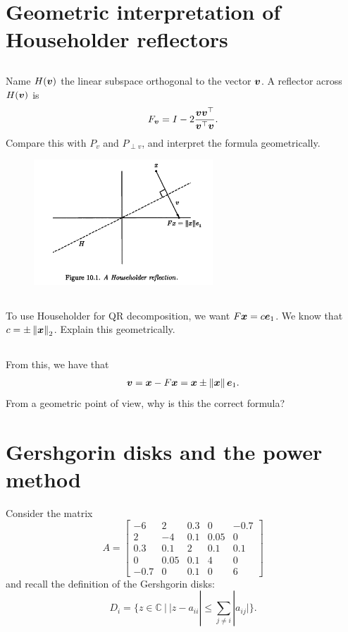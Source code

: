 \documentclass[11pt,letterpaper]{article}
\begin{document}
 

\section{Geometric interpretation of Householder reflectors}
\subsection{}
Name $H(\boldsymbol{v})$ the linear subspace orthogonal to the vector $\boldsymbol{v}$. A reflector across $H(\boldsymbol{v})$ is 
\begin{align*}
    F_{\boldsymbol{v}} = I - 2 \frac{\boldsymbol{v} \boldsymbol{v}^\top}{\boldsymbol{v}^\top \boldsymbol{v}}.
\end{align*}
Compare this with $P_v$ and $P_{\perp v}$, and interpret the formula geometrically.

\begin{figure}[H]
    \centering
    \includegraphics[width = 0.6\textwidth]{Session_7/latex/figs/TB_HouseholderRef}
\end{figure}

\subsection{}
To use Householder for QR decomposition, we want $F\boldsymbol{x} = c\boldsymbol{e}_1$. We know that $c = \pm\left\Vert \boldsymbol{x} \right\Vert_2$. Explain this geometrically.

\subsection{}
From this, we have that
\begin{align*}
    \boldsymbol{v} = \boldsymbol{x}- F\boldsymbol{x} =  \boldsymbol{x} \pm \left\Vert \boldsymbol{x} \right\Vert\boldsymbol{e}_1.
\end{align*}
From a geometric point of view, why is this the correct formula?

\section{Gershgorin disks and the power method}
Consider the matrix 
$$
A = \begin{bmatrix}
- 6 & 2 & 0.3 & 0 & -0.7 \\
2 & - 4 & 0.1 & 0.05 & 0 \\
0.3 & 0.1 & 2 & 0.1 & 0.1 \\
0 & 0.05 & 0.1 &  4 & 0 \\
-0.7 & 0 & 0.1  & 0  & 6
\end{bmatrix}
$$
and recall the definition of the Gershgorin disks:
\[
D_i = \{ z \in \mathbb C ~|~ |z - a_{ii}| \le \sum_{j \ne i} |a_{ij}| \}.
\]
\end{document}
